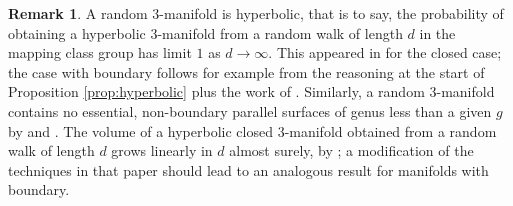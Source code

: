 \documentclass[12pt]{amsart}
\theoremstyle{definition}
\newtheorem{rem}[thm]{Remark}
\newcommand{\ra}{\rightarrow}
\begin{document}
\begin{rem}
	A random $3$-manifold is hyperbolic, that is to say, the probability of obtaining a hyperbolic $3$-manifold from a random walk of length $d$ in the mapping class group has limit $1$ as $d\ra\infty$. This appeared in \cite{Mah} for the closed case; the case with boundary follows for example from the reasoning at the start of Proposition \ref{prop:hyperbolic} plus the work of \cite{Mah}. Similarly, a random $3$-manifold contains no essential, non-boundary parallel surfaces of genus less than a given $g$ by \cite{Sch} and \cite{Mah}. The volume of a hyperbolic closed $3$-manifold obtained from a random walk of length $d$ grows linearly in $d$ almost surely, by \cite{Via}; a modification of the techniques in that paper should lead to an analogous result for manifolds with boundary.
\end{rem}


\end{document}
